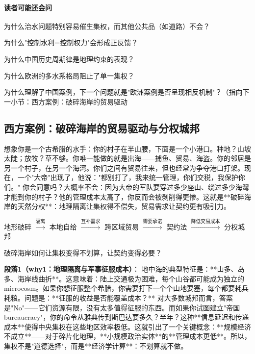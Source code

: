 \documentclass[openany, a4paper, 12pt]{book}
\newenvironment{logicmap}{
	\begin{tcolorbox}[
		colback=blue!5!white,      %
		colframe=blue!50!black,    %
		title=\textbf{逻辑地图 (Logic Map)}, %
		fonttitle=\bfseries,
		sharp corners=south,       %
		boxrule=0.5mm
		]
	\centering
	}{
	\end{tcolorbox}
}
\newenvironment{motivation}{
	\vspace{0.5em}
	\begin{tcolorbox}[
		colback=gray!10,           %
		colframe=gray!60,          %
		title=\textit{本章动机 (Motivation)},
		fonttitle=\bfseries,
		arc=0mm,                   %
		leftrule=3mm               %
		]
		\small \itshape %
	}{
	\end{tcolorbox}
	\vspace{1em}
}
\begin{document}
	\paragraph*{读者可能还会问}
	\item 为什么治水问题特别容易催生集权，而其他公共品（如道路）不会？
	\item 为什么"控制水利=控制权力"会形成正反馈？
	\item 为什么中国历史周期律是地理约束的表现？
	\item 为什么欧洲的多水系格局阻止了单一集权？
	\item 为什么理解了中国案例，下一个问题就是"欧洲案例是否呈现相反机制"？（指向下一小节：西方案例：破碎海岸的贸易驱动
	
	\subsection{西方案例：破碎海岸的贸易驱动与分权城邦}
	
	\begin{motivation}
		想象你是一个古希腊的水手：你的村子在半山腰，下面是一个小港口。种地？山坡太陡；放牧？草不够。你唯一能做的就是出海——捕鱼、贸易、海盗。你的邻居是另一个村子，在另一个海湾。你们之间有贸易往来，但也经常为争夺港口打架。现在，一个"大帝"出现了，他说："都别打了，我来统一管理，你们交税，我保护你们。" 你会同意吗？大概率不会：因为大帝的军队要穿过多少座山、绕过多少海灣才能到你的村子？他的管理成本太高了，你反而会被剥削得更惨。这就是**破碎海岸的天然分权**：地理隔离让集权得不偿失，贸易需求让契约更有吸引力。
	\end{motivation}
	
	\begin{logicmap}
		地形破碎 $\xrightarrow{\text{隔离}}$ 本地自给 $\xrightarrow{\text{互补需求}}$ 跨区域贸易 $\xrightarrow{\text{需要承诺}}$ 契约法 $\xrightarrow{\text{降低交易成本}}$ 分权城邦
	\end{logicmap}
	
	\begin{questionbox}
		破碎海岸如何让集权变得不划算，让契约变得必要？
	\end{questionbox}
	
	\textbf{段落1（why1：地理隔离与军事征服成本）}：  
	地中海的典型特征是：**山多、岛多、海岸线曲折**。这意味着：陆上交通极为困难，每个山谷都可能成为独立的 microcosm。如果你想征服整个希腊，你需要打下一个个山地要塞，每个都要耗兵耗粮。问题是：**征服的收益是否能覆盖成本？** 对大多数城邦而言，答案是"No"——它们资源有限，没有太多值得征服的东西。而如果你试图建立"帝国 bureaucracy"，你的命令从雅典传到斯巴达要多久？半年？这种**信息延迟和传递成本**使得中央集权在这些地区效率极低。这就引出了一个关键概念：**规模经济不成立**——对于碎片化地理，**小规模政治实体**的**管理成本更低**。所以，集权不是"道德选择"，而是**经济学计算**：不划算就不做。
	
\end{document}
